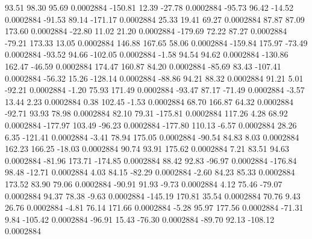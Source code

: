       93.51       98.30       95.69     0.0002884
     -150.81       12.39      -27.78     0.0002884
      -95.73       96.42      -14.52     0.0002884
      -91.53       89.14     -171.17     0.0002884
       25.33       19.41       69.27     0.0002884
       87.87       87.09      173.60     0.0002884
      -22.80       11.02       21.20     0.0002884
     -179.69       72.22       87.27     0.0002884
      -79.21      173.33       13.05     0.0002884
      146.88      167.65       58.06     0.0002884
     -159.84      175.97      -73.49     0.0002884
      -93.52       94.66     -102.05     0.0002884
       -1.58       94.54       94.62     0.0002884
     -130.86      162.47      -46.59     0.0002884
      174.47      160.87       84.20     0.0002884
      -85.69       83.43     -107.41     0.0002884
      -56.32       15.26     -128.14     0.0002884
      -88.86       94.21       88.32     0.0002884
       91.21        5.01      -92.21     0.0002884
       -1.20       75.93      171.49     0.0002884
      -93.47       87.17      -71.49     0.0002884
       -3.57       13.44        2.23     0.0002884
        0.38      102.45       -1.53     0.0002884
       68.70      166.87       64.32     0.0002884
      -92.71       93.93       78.98     0.0002884
       82.10       79.31     -175.81     0.0002884
      117.26        4.28       68.92     0.0002884
     -177.97      103.49      -96.23     0.0002884
     -177.80      110.13       -6.57     0.0002884
       28.26        6.35     -121.41     0.0002884
       -3.41       78.94      175.05     0.0002884
      -90.54       84.83        8.03     0.0002884
      162.23      166.25      -18.03     0.0002884
       90.74       93.91      175.62     0.0002884
        7.21       83.51       94.63     0.0002884
      -81.96      173.71     -174.85     0.0002884
       88.42       92.83      -96.97     0.0002884
     -176.84       98.48      -12.71     0.0002884
        4.03       84.15      -82.29     0.0002884
       -2.60       84.23       85.33     0.0002884
      173.52       83.90       79.06     0.0002884
      -90.91       91.93       -9.73     0.0002884
        4.12       75.46      -79.07     0.0002884
       94.37       78.38       -9.63     0.0002884
     -145.19      170.81       35.54     0.0002884
       70.76        9.43       26.76     0.0002884
       -4.81       76.14      171.66     0.0002884
       -5.28       95.97      177.56     0.0002884
      -71.31        9.84     -105.42     0.0002884
      -96.91       15.43      -76.30     0.0002884
      -89.70       92.13     -108.12     0.0002884
